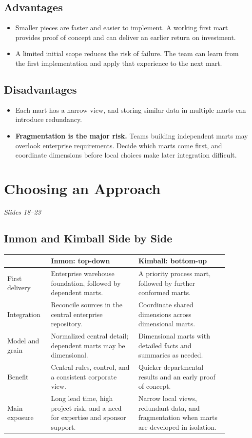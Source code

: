 \documentclass[12pt,a4paper]{article}
\newcommand{\slides}[1]{\textit{\small #1}\par}
\newcommand{\rowgap}{\\[4pt]}
\begin{document}
\subsection{Advantages}
\begin{itemize}
\item Smaller pieces are faster and easier to implement. A working first mart provides proof of concept and can deliver an earlier return on investment.
\item A limited initial scope reduces the risk of failure. The team can learn from the first implementation and apply that experience to the next mart.
\end{itemize}

\subsection{Disadvantages}
\begin{itemize}
\item Each mart has a narrow view, and storing similar data in multiple marts can introduce redundancy.
\item \textbf{Fragmentation is the major risk.} Teams building independent marts may overlook enterprise requirements. Decide which marts come first, and coordinate dimensions before local choices make later integration difficult.
\end{itemize}

\newpage
\section{Choosing an Approach}
\slides{Slides 18--23}
\subsection{Inmon and Kimball Side by Side}
\begin{center}\small
\begin{tabular}{@{}p{0.17\linewidth}p{0.36\linewidth}p{0.37\linewidth}@{}}\hline
 & \textbf{Inmon: top-down} & \textbf{Kimball: bottom-up}\\ \hline
First delivery & Enterprise warehouse foundation, followed by dependent marts. & A priority process mart, followed by further conformed marts.\rowgap
Integration & Reconcile sources in the central enterprise repository. & Coordinate shared dimensions across dimensional marts.\rowgap
Model and grain & Normalized central detail; dependent marts may be dimensional. & Dimensional marts with detailed facts and summaries as needed.\rowgap
Benefit & Central rules, control, and a consistent corporate view. & Quicker departmental results and an early proof of concept.\rowgap
Main exposure & Long lead time, high project risk, and a need for expertise and sponsor support. & Narrow local views, redundant data, and fragmentation when marts are developed in isolation.\\ \hline
\end{tabular}
\end{center}
\end{document}
